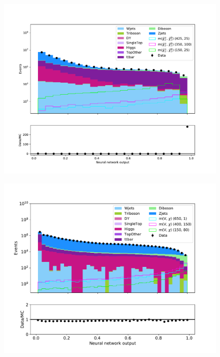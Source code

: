 \begin{figure}[H]
    \centering
        \includegraphics[width = \textwidth]{Figures/Stacked/stackedplot_NN_High_level_WW.pdf}
        \caption{}
        \label{fig:traintestscaled}
\end{figure}





\begin{figure}[H]
    \centering
        \includegraphics[width = \textwidth]{Figures/Stacked/stackedplot_NN_All_level_monoZ.pdf}
        \caption{}
        \label{fig:traintestscaled}
\end{figure}

